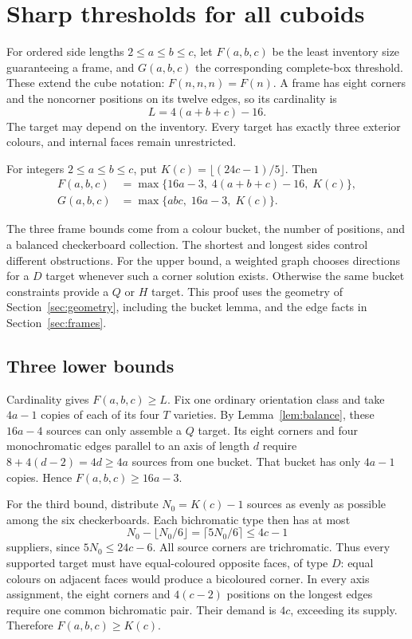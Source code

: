 \section{Sharp thresholds for all cuboids}\label{sec:cuboids}
For ordered side lengths $2\le a\le b\le c$, let $F(a,b,c)$ be the least
inventory size guaranteeing a frame, and $G(a,b,c)$ the corresponding
complete-box threshold. These extend the cube notation: $F(n,n,n)=F(n)$.
A frame has eight corners and the noncorner positions on its twelve edges,
so its cardinality is
\[
 L=4(a+b+c)-16.
\]
The target may depend on the inventory. Every target has exactly three
exterior colours, and internal faces remain unrestricted.

\begin{theorem}\label{thm:cuboids}
For integers $2\le a\le b\le c$, put $K(c)=\lfloor(24c-1)/5\rfloor$. Then
\begin{align*}
 F(a,b,c)&=\max\{16a-3,\;4(a+b+c)-16,\;K(c)\},\\
 G(a,b,c)&=\max\{abc,\;16a-3,\;K(c)\}.
\end{align*}
\end{theorem}
The three frame bounds come from a colour bucket, the number of positions,
and a balanced checkerboard collection. The shortest and longest sides
control different obstructions. For the upper bound, a weighted graph
chooses directions for a $D$ target whenever such a corner solution exists.
Otherwise the same bucket constraints provide a $Q$ or $H$ target.
This proof uses the geometry of Section~\ref{sec:geometry}, including the bucket lemma,
and the edge facts in Section~\ref{sec:frames}.

\subsection{Three lower bounds}
Cardinality gives $F(a,b,c)\ge L$. Fix one ordinary orientation class and
take $4a-1$ copies of each of its four $T$ varieties. By
Lemma~\ref{lem:balance}, these $16a-4$ sources can only assemble a $Q$
target. Its eight corners and four monochromatic edges parallel to an
axis of length $d$ require $8+4(d-2)=4d\ge4a$ sources from one bucket.
That bucket has only $4a-1$ copies. Hence $F(a,b,c)\ge16a-3$.

For the third bound, distribute $N_0=K(c)-1$ sources as evenly as possible
among the six checkerboards. Each bichromatic type then has at most
\[
 N_0-\lfloor N_0/6\rfloor=\lceil5N_0/6\rceil\le4c-1
\]
suppliers, since $5N_0\le24c-6$. All source corners are trichromatic.
Thus every supported target must have equal-coloured opposite faces,
of type $D$: equal colours on adjacent faces would produce a bicoloured
corner. In every axis assignment, the eight corners and $4(c-2)$ positions
on the longest edges require one common bichromatic pair. Their demand
is $4c$, exceeding its supply. Therefore $F(a,b,c)\ge K(c)$.

